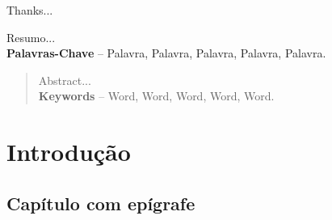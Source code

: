 \documentclass[]{politex}
\begin{document}
\capa
\falsafolhaderosto
\folhaderosto








\begin{agradecimentos}

Thanks...

\end{agradecimentos}




\begin{resumo}
Resumo...
%
\\[3\baselineskip]
%
\textbf{Palavras-Chave} -- Palavra, Palavra, Palavra, Palavra, Palavra.
\end{resumo}


\begin{abstract}
Abstract...
%
\\[3\baselineskip]
%
\textbf{Keywords} -- Word, Word, Word, Word, Word.
\end{abstract}


\listadefiguras
\listadetabelas

\sumario




\part{Introdução}
	
\chapter{Capítulo com epígrafe}
\end{document}
